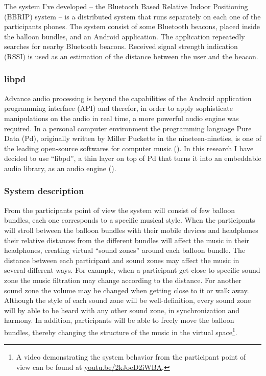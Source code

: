 \documentclass[a4paper,11pt]{article}
\begin{document}
The system I've developed -- the Bluetooth Based Relative Indoor Positioning (BBRIP) system -- is a distributed system that runs separately on each one of the participants phones.
The system consist of some Bluetooth beacons, placed inside the balloon bundles, and an Android application.
The application repeatedly searches for nearby Bluetooth beacons.
Received signal strength indication (RSSI) is used as an estimation of the distance between the user and the beacon.

\subsubsection{libpd}\label{methods:libpd}

Advance audio processing is beyond the capabilities of the Android application programming interface (API) and therefor, in order to apply sophisticate manipulations on the audio in real time, a more powerful audio engine was required.
In a personal computer environment the programming language Pure Data (Pd), originally written by Miller Puckette in the nineteen-nineties, is one of the leading open-source softwares for computer music (\citeauthor{web:pd}).
In this research I have decided to use ``libpd'', a thin layer on top of Pd that turns it into an embeddable audio library, as an audio engine (\cite[p. v]{brinkmann12}).

\subsubsection{System description}\label{systemdescription}


From the participants point of view the system will consist of few balloon bundles, each one corresponds to a specific musical style.
When the participants will stroll between the balloon bundles with their mobile devices and headphones their relative distances from the different bundles will affect the music in their headphones, creating virtual ``sound zones'' around each balloon bundle.
The distance between each participant and sound zones may affect the music in several different ways.
For example, when a participant get close to specific sound zone the music filtration may change according to the distance.
For another sound zone the volume may be changed when getting close to it or walk away.
Although the style of each sound zone will be well-definition, every sound zone will by able to be heard with any other sound zone, in synchronization and harmony.
In addition, participants will be able to freely move the balloon bundles, thereby changing the structure of the music in the virtual space\footnote{A video demonstrating the system behavior from the participant point of view can be found at \href{http://youtu.be/2kJoeD2iWBA}{youtu.be/2kJoeD2iWBA}.}.
\end{document}
